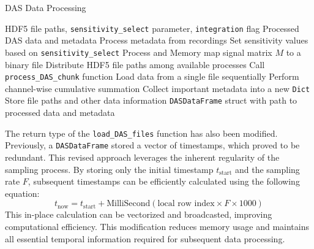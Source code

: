 \begin{algorithm}[!h]
\caption{DAS Data Processing}
\begin{algorithmic}[1]
\Require HDF5 file paths, \texttt{sensitivity\_select} parameter, \texttt{integration} flag
\Ensure Processed DAS data and metadata
\State Process metadata from recordings
\State Set sensitivity values based on \texttt{sensitivity\_select}
    \State Process and Memory map  signal matrix $M$ to a binary file
\Else
        \State Distribute HDF5 file paths among available processes
            \State Call \texttt{process\_DAS\_chunk} function
        \EndFor
    \Else 
            \State Load data from a single file sequentially
        \EndFor
    \EndIf
\EndIf
{}
    \State Perform channel-wise cumulative summation
\EndIf
\State Collect important metadata into a new \texttt{Dict}
\State Store file paths and other data information
\State \Return \texttt{DASDataFrame} struct with path to processed data and metadata
\end{algorithmic}
\label{alg:loaddas}
\end{algorithm}
The return type of the \texttt{load\_DAS\_files} function has also been modified. Previously, a \texttt{DASDataFrame} stored a vector of timestamps, which proved to be redundant. This revised approach leverages the inherent regularity of the sampling process. By storing only the initial timestamp $t_{\text{start}}$ and the sampling rate $F$, subsequent timestamps can be efficiently calculated using the following equation:
$$
    t_{\text{now}} = t_{\text{start}} + \text{MilliSecond}(\text{local row index} \times F \times 1000)
$$
%
This in-place calculation can be vectorized and broadcasted, improving computational efficiency. This modification reduces memory usage and maintains all essential temporal information required for subsequent data processing. 
\clearpage


